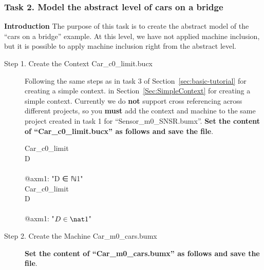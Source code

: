 \subsubsection{Task 2. Model the abstract level of cars on a bridge}
\textbf{Introduction} The purpose of this task is to create the abstract model of the ``cars on a bridge'' example. At this level, we have not applied machine inclusion, but it is possible to apply machine inclusion right from the abstract level. 
\begin{description}
	\item[Step 1. Create the Context Car\_c0\_limit.bucx] 
	Following the same steps as 
	\ifplastex
	in task 3 of Section~\ref{sec:basic-tutorial} for creating a simple context.  
	\else
	in Section~\ref{Sec:SimpleContext} for creating a simple context.
	\fi
	Currently we do \textbf{not} support cross referencing across different projects, so you \textbf{must} add the context and machine to the same project created in task 1 for ``Sensor\_m0\_SNSR.bumx''. \textbf{Set the content of ``Car\_c0\_limit.bucx'' as follows and save the file}.
	  
	  \begin{center}
		\begin{Bcode}
			\ifplastex
			\Bcontext{} Car_c0_limit\\
			\Bconstants{} D\\
			\Baxioms\\
			@axm1: "D ∈ ℕ1"\\
			\Bend
			\else
			\Bcontext{} Car_c0_limit\\
			\Bconstants{} D\\
			\Baxioms\\
			\Btab @axm1: "\(D \in \nat1\)"\\
			\Bend
			\fi
		\end{Bcode}
	\end{center}
	\item[Step 2. Create the Machine Car\_m0\_cars.bumx]\textbf{Set the content of ``Car\_m0\_cars.bumx'' as follows and save the file}.


\end{description}
